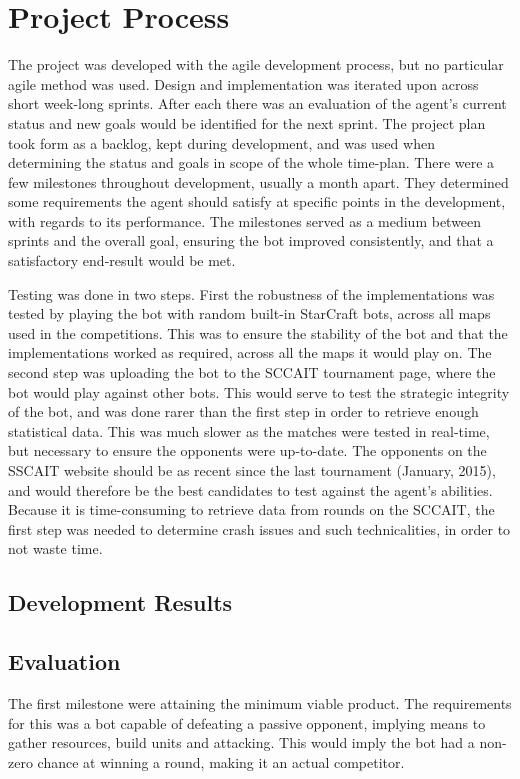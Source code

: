 \chapter{Project Process}
The project was developed with the agile development process, but no particular agile method was used. Design and implementation was iterated upon across short week-long sprints. After each there was an evaluation of the agent's current status and new goals would be identified for the next sprint. The project plan took form as a backlog, kept during development, and was used when determining the status and goals in scope of the whole time-plan. There were a few milestones throughout development, usually a month apart. They determined some requirements the agent should satisfy at specific points in the development, with regards to its performance. The milestones served as a medium between sprints and the overall goal, ensuring the bot improved consistently, and that a satisfactory end-result would be met.

Testing was done in two steps. First the robustness of the implementations was tested by playing the bot with random built-in StarCraft bots, across all maps used in the competitions. This was to ensure the stability of the bot and that the implementations worked as required, across all the maps it would play on. The second step was uploading the bot to the SCCAIT tournament page, where the bot would play against other bots. This would serve to test the strategic integrity of the bot, and was done rarer than the first step in order to retrieve enough statistical data. This was much slower as the matches were tested in real-time, but necessary to ensure the opponents were up-to-date. The opponents on the SSCAIT website should be as recent since the last tournament (January, 2015), and would therefore be the best candidates to test against the agent's abilities. Because it is time-consuming to retrieve data from rounds on the SCCAIT, the first step was needed to determine crash issues and such technicalities, in order to not waste time.

\section{Development Results}

\section{Evaluation}
The first milestone were attaining the minimum viable product. The requirements for this was a bot capable of defeating a passive opponent, implying means to gather resources, build units and attacking. This would imply the bot had a non-zero chance at winning a round, making it an actual competitor.



